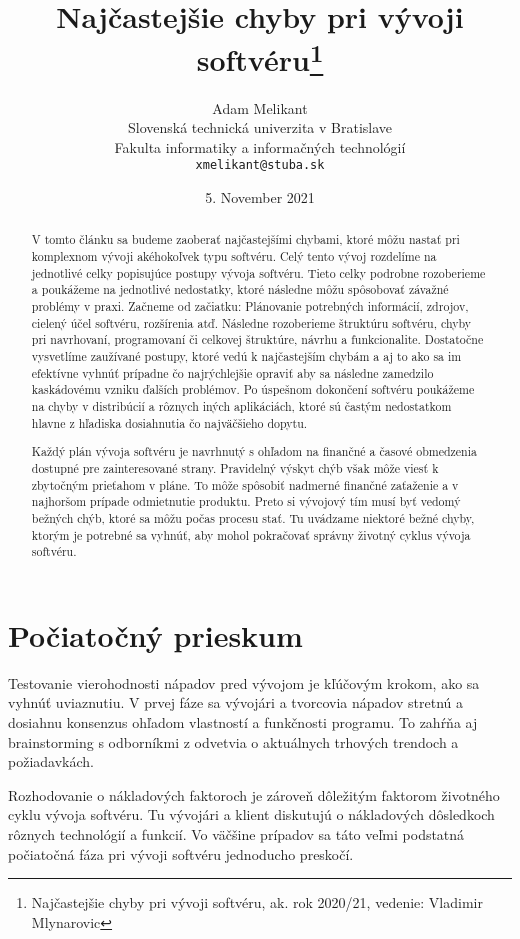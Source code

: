 \documentclass[10pt,twoside,slovak,a4paper]{article}
\title{Najčastejšie chyby pri vývoji softvéru\thanks{Najčastejšie chyby pri vývoji softvéru, ak. rok 2020/21, vedenie: Vladimir Mlynarovic}} %
\author{Adam Melikant\\[2pt]
	{\small Slovenská technická univerzita v Bratislave}\\
	{\small Fakulta informatiky a informačných technológií}\\
	{\small \texttt{xmelikant@stuba.sk}}
	}
\date{\small 5. November 2021} %
\begin{document}
\maketitle

\begin{abstract}
V tomto článku sa budeme zaoberať najčastejšími chybami, ktoré môžu nastať pri komplexnom vývoji akéhokoľvek typu softvéru. Celý tento vývoj rozdelíme na jednotlivé celky popisujúce postupy vývoja softvéru. Tieto celky podrobne rozoberieme a poukážeme na jednotlivé nedostatky, ktoré následne môžu spôsobovať závažné problémy v praxi. Začneme od začiatku: Plánovanie potrebných informácií, zdrojov, cielený účel softvéru, rozšírenia atď. Následne rozoberieme štruktúru softvéru, chyby pri navrhovaní, programovaní či celkovej štruktúre, návrhu a funkcionalite. Dostatočne vysvetlíme zaužívané postupy, ktoré vedú k najčastejším chybám a aj to ako sa im efektívne vyhnúť prípadne čo najrýchlejšie opraviť aby sa následne zamedzilo kaskádovému vzniku ďalších problémov. Po úspešnom dokončení softvéru poukážeme na chyby v distribúcií a rôznych iných aplikáciách, ktoré sú častým nedostatkom hlavne z hľadiska dosiahnutia čo najväčšieho dopytu.

Každý plán vývoja softvéru je navrhnutý s ohľadom na finančné a časové obmedzenia dostupné pre zainteresované strany. Pravidelný výskyt chýb však môže viesť k zbytočným prieťahom v pláne. To môže spôsobiť nadmerné finančné zaťaženie a v najhoršom prípade odmietnutie produktu. Preto si vývojový tím musí byť vedomý bežných chýb, ktoré sa môžu počas procesu stať. Tu uvádzame niektoré bežné chyby, ktorým je potrebné sa vyhnúť, aby mohol pokračovať správny životný cyklus vývoja softvéru.
\end{abstract}







\section{Počiatočný prieskum}
Testovanie vierohodnosti nápadov pred vývojom je kľúčovým krokom, ako sa vyhnúť uviaznutiu. V prvej fáze sa vývojári a tvorcovia nápadov stretnú a dosiahnu konsenzus ohľadom vlastností a funkčnosti programu. To zahŕňa aj brainstorming s odborníkmi z odvetvia o aktuálnych trhových trendoch a požiadavkách. 

Rozhodovanie o nákladových faktoroch je zároveň dôležitým faktorom životného cyklu vývoja softvéru. Tu vývojári a klient diskutujú o nákladových dôsledkoch rôznych technológií a funkcií. Vo väčšine prípadov sa táto veľmi podstatná počiatočná fáza pri vývoji softvéru jednoducho preskočí.
\end{document}
